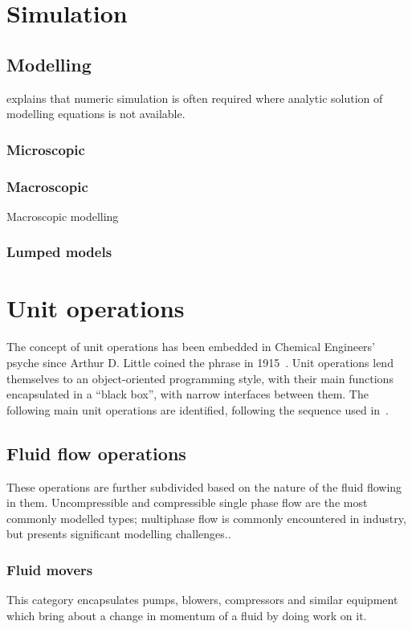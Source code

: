 \section{Simulation}

\subsection{Modelling}
\citet[177]{giordano.fox.ea2009first} explains that numeric simulation is often required where analytic solution of modelling equations is not available.  

\subsubsection{Microscopic}

\subsubsection{Macroscopic}
Macroscopic modelling 

\subsubsection{Lumped models}


\section{Unit operations}
The concept of unit operations has been embedded in Chemical Engineers' psyche since Arthur D. Little coined the phrase in 1915~\citep{hougen1972seven}.  
Unit operations lend themselves to an object-oriented programming style, with their main functions encapsulated in a ``black box'', with narrow interfaces between them.
The following main unit operations are identified, following the sequence used in~\citet{msh}.

\subsection{Fluid flow operations}
These operations are further subdivided based on the nature of the
fluid flowing in them.  Uncompressible and compressible single phase
flow are the most commonly modelled types; multiphase flow is commonly
encountered in industry, but presents significant modelling
challenges.\citehere.

\subsubsection{Fluid movers}
This category encapsulates pumps, blowers, compressors and similar
equipment which bring about a change in momentum of a fluid by doing
work on it.  

